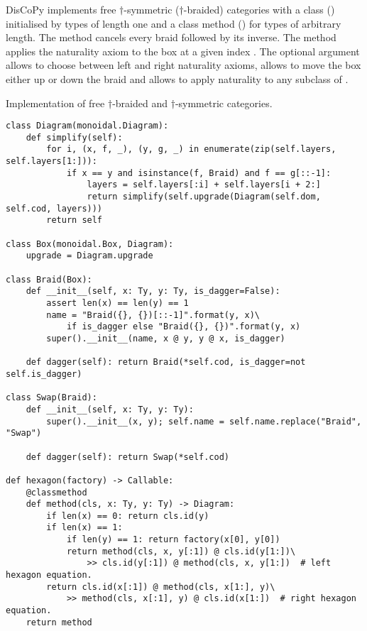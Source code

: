 DisCoPy implements free $\dagger$-symmetric ($\dagger$-braided) categories with a class  () initialised by types of length one and a class method  () for types of arbitrary length.
The method  cancels every braid followed by its inverse.
The  method applies the naturality axiom to the box at a given index .
The optional argument  allows to choose between left and right naturality axioms,  allows to move the box either up or down the braid and  allows to apply naturality to any subclass of .

\begin{python}
{\normalfont Implementation of free $\dagger$-braided and $\dagger$-symmetric categories.}

\begin{verbatim}
class Diagram(monoidal.Diagram):
    def simplify(self):
        for i, (x, f, _), (y, g, _) in enumerate(zip(self.layers, self.layers[1:])):
            if x == y and isinstance(f, Braid) and f == g[::-1]:
                layers = self.layers[:i] + self.layers[i + 2:]
                return simplify(self.upgrade(Diagram(self.dom, self.cod, layers)))
        return self

class Box(monoidal.Box, Diagram):
    upgrade = Diagram.upgrade

class Braid(Box):
    def __init__(self, x: Ty, y: Ty, is_dagger=False):
        assert len(x) == len(y) == 1
        name = "Braid({}, {})[::-1]".format(y, x)\
            if is_dagger else "Braid({}, {})".format(y, x)
        super().__init__(name, x @ y, y @ x, is_dagger)

    def dagger(self): return Braid(*self.cod, is_dagger=not self.is_dagger)

class Swap(Braid):
    def __init__(self, x: Ty, y: Ty):
        super().__init__(x, y); self.name = self.name.replace("Braid", "Swap")

    def dagger(self): return Swap(*self.cod)

def hexagon(factory) -> Callable:
    @classmethod
    def method(cls, x: Ty, y: Ty) -> Diagram:
        if len(x) == 0: return cls.id(y)
        if len(x) == 1:
            if len(y) == 1: return factory(x[0], y[0])
            return method(cls, x, y[:1]) @ cls.id(y[1:])\
                >> cls.id(y[:1]) @ method(cls, x, y[1:])  # left hexagon equation.
        return cls.id(x[:1]) @ method(cls, x[1:], y)\
            >> method(cls, x[:1], y) @ cls.id(x[1:])  # right hexagon equation.
    return method


\end{verbatim}
\end{python}
